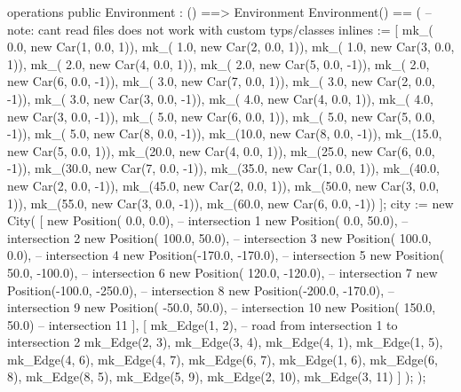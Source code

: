 \documentclass[a4paper]{article}
\begin{document}
\begin{vdm_al}
operations
    public Environment : () ==> Environment
    Environment() == (
        -- note: cant read files does not work with custom typs/classes
        inlines := [
            mk_( 0.0, new Car(1, 0.0,  1)),
            mk_( 1.0, new Car(2, 0.0,  1)),
            mk_( 1.0, new Car(3, 0.0,  1)),
            mk_( 2.0, new Car(4, 0.0,  1)),
            mk_( 2.0, new Car(5, 0.0, -1)),
            mk_( 2.0, new Car(6, 0.0, -1)),
            mk_( 3.0, new Car(7, 0.0,  1)),
            mk_( 3.0, new Car(2, 0.0, -1)),
            mk_( 3.0, new Car(3, 0.0, -1)),
            mk_( 4.0, new Car(4, 0.0,  1)),
            mk_( 4.0, new Car(3, 0.0, -1)),
            mk_( 5.0, new Car(6, 0.0,  1)),
            mk_( 5.0, new Car(5, 0.0, -1)),
            mk_( 5.0, new Car(8, 0.0, -1)),
            mk_(10.0, new Car(8, 0.0, -1)),
            mk_(15.0, new Car(5, 0.0,  1)),
            mk_(20.0, new Car(4, 0.0,  1)),
            mk_(25.0, new Car(6, 0.0, -1)),
            mk_(30.0, new Car(7, 0.0, -1)),
            mk_(35.0, new Car(1, 0.0,  1)),
            mk_(40.0, new Car(2, 0.0, -1)),
            mk_(45.0, new Car(2, 0.0,  1)),
            mk_(50.0, new Car(3, 0.0,  1)),
            mk_(55.0, new Car(3, 0.0, -1)),
            mk_(60.0, new Car(6, 0.0, -1))
        ];
        city := new City(
            [
                new Position(   0.0,    0.0), -- intersection 1
                new Position(   0.0,   50.0), -- intersection 2
                new Position( 100.0,   50.0), -- intersection 3
                new Position( 100.0,    0.0), -- intersection 4
                new Position(-170.0, -170.0), -- intersection 5
                new Position(  50.0, -100.0), -- intersection 6
                new Position( 120.0, -120.0), -- intersection 7
                new Position(-100.0, -250.0), -- intersection 8
                new Position(-200.0, -170.0), -- intersection 9
                new Position( -50.0,   50.0), -- intersection 10
                new Position( 150.0,   50.0)  -- intersection 11
            ],
            [
                mk_Edge(1, 2), -- road from intersection 1 to intersection 2
                mk_Edge(2, 3),
                mk_Edge(3, 4),
                mk_Edge(4, 1),
                mk_Edge(1, 5),
                mk_Edge(4, 6),
                mk_Edge(4, 7),
                mk_Edge(6, 7),
                mk_Edge(1, 6),
                mk_Edge(6, 8),
                mk_Edge(8, 5),
                mk_Edge(5, 9),
                mk_Edge(2, 10),
                mk_Edge(3, 11)
            ]
        );
    );


\end{vdm_al}
\end{document}
